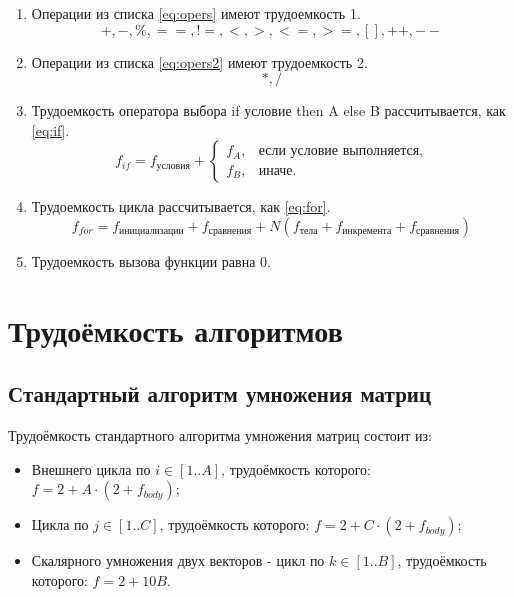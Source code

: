 \begin{enumerate}
    \item Операции из списка \eqref{eq:opers} имеют трудоемкость 1.
    \begin{equation}
        \label{eq:opers}
        +, -, \%, ==, !=, <, >, <=, >=, [], ++, {-}-
    \end{equation}
    \item Операции из списка \eqref{eq:opers2} имеют трудоемкость 2.
    \begin{equation}
        \label{eq:opers2}
        *, /
    \end{equation}
    \item Трудоемкость оператора выбора if условие then A else B рассчитывается, как \eqref{eq:if}.
    \begin{equation}
        \label{eq:if}
        f_{if} = f_{\text{условия}} +
        \begin{cases}
            f_A, & \text{если условие выполняется,}\\
            f_B, & \text{иначе.}
        \end{cases}
    \end{equation}
    \item Трудоемкость цикла рассчитывается, как \eqref{eq:for}.
    \begin{equation}
        \label{eq:for}
        f_{for} = f_{\text{инициализации}} + f_{\text{сравнения}} + N(f_{\text{тела}} + f_{\text{инкремента}} + f_{\text{сравнения}})
    \end{equation}
    \item Трудоемкость вызова функции равна 0.
\end{enumerate}

\section{Трудоёмкость алгоритмов}

\subsection{Стандартный алгоритм умножения матриц}

Трудоёмкость стандартного алгоритма умножения матриц состоит из:
\begin{itemize}
    \item Внешнего цикла по $i \in [1..A]$, трудоёмкость которого: $f = 2 + A \cdot (2 + f_{body})$;
    \item Цикла по $j \in [1..C]$, трудоёмкость которого: $f = 2 + C \cdot (2 + f_{body})$;
    \item Скалярного умножения двух векторов - цикл по $k \in [1..B]$, трудоёмкость которого: $f = 2 + 10B$.
\end{itemize}


